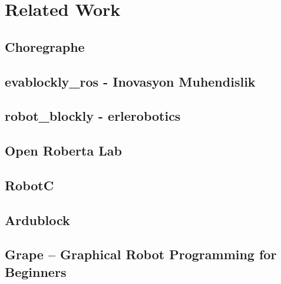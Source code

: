 \chapter{Related Work}
\section{Choregraphe}
\section{evablockly\_ros - Inovasyon Muhendislik}
\section{robot\_blockly - erlerobotics}
\section{Open Roberta Lab}
\section{RobotC}
\section{Ardublock}
\section{Grape – Graphical Robot Programming for Beginners}